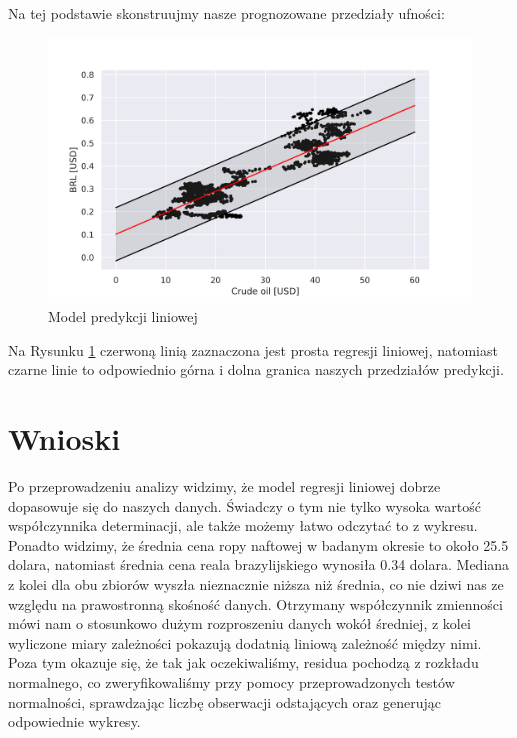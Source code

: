 \documentclass[fleqn]{article}
\begin{document}
    \noindent Na tej podstawie skonstruujmy nasze prognozowane przedziały ufności:
    \begin{figure}[H]
        \centering
        \includegraphics[width=16cm]{fig7.png}
        \caption{Model predykcji liniowej}
        \label{fig:7}
    \end{figure}    
    \noindent Na Rysunku \ref{fig:7} czerwoną linią zaznaczona jest prosta regresji liniowej, natomiast czarne linie to odpowiednio górna i dolna granica naszych przedziałów predykcji.


    \section{Wnioski}

    Po przeprowadzeniu analizy widzimy, że model regresji liniowej dobrze dopasowuje się do naszych danych. Świadczy o tym nie tylko wysoka wartość współczynnika determinacji, 
    ale także możemy łatwo odczytać to z wykresu. Ponadto widzimy, że średnia cena ropy naftowej w badanym okresie to około 25.5 dolara, natomiast średnia cena reala brazylijskiego wynosiła 0.34 dolara.
    Mediana z kolei dla obu zbiorów wyszła nieznacznie niższa niż średnia, co nie dziwi nas ze względu na prawostronną skośność danych. Otrzymany współczynnik zmienności mówi nam o stosunkowo dużym rozproszeniu danych
    wokół średniej, z kolei wyliczone miary zależności pokazują dodatnią liniową zależność między nimi. Poza tym okazuje się, że tak jak oczekiwaliśmy, 
    residua pochodzą z rozkładu normalnego, co zweryfikowaliśmy przy pomocy przeprowadzonych testów normalności, sprawdzając liczbę obserwacji odstających oraz generując odpowiednie wykresy.
\end{document}
